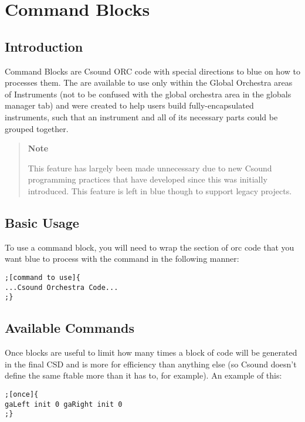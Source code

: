 \section{Command Blocks}\label{commandBlocks}

\subsection{Introduction}

Command Blocks are Csound ORC code with special directions to blue on
how to processes them. The are available to use only within the Global
Orchestra areas of Instruments (not to be confused with the global
orchestra area in the globals manager tab) and were created to help
users build fully-encapsulated instruments, such that an instrument and
all of its necessary parts could be grouped together.

\begin{quote}
\textbf{Note}

This feature has largely been made unnecessary due to new Csound
programming practices that have developed since this was initially
introduced. This feature is left in blue though to support legacy
projects.
\end{quote}

\subsection{Basic Usage}

To use a command block, you will need to wrap the section of orc code
that you want blue to process with the command in the following manner:

\begin{verbatim}
;[command to use]{ 
...Csound Orchestra Code... 
;}
\end{verbatim}

\subsection{Available Commands}

Once blocks are useful to limit how many times a block of code will be
generated in the final CSD and is more for efficiency than anything else
(so Csound doesn't define the same ftable more than it has to, for
example). An example of this:

\begin{verbatim}
;[once]{ 
gaLeft init 0 gaRight init 0 
;}
\end{verbatim}

